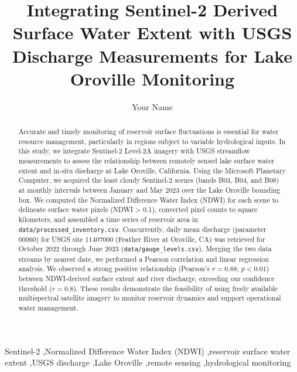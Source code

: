 \documentclass[preprint,12pt]{elsarticle}
\begin{document}
\begin{frontmatter}

\title{Integrating Sentinel-2 Derived Surface Water Extent with USGS Discharge Measurements for Lake Oroville Monitoring}

\author[1]{Your Name}

\begin{abstract}
Accurate and timely monitoring of reservoir surface fluctuations is essential for water resource management, particularly in regions subject to variable hydrological inputs. In this study, we integrate Sentinel-2 Level-2A imagery with USGS streamflow measurements to assess the relationship between remotely sensed lake surface water extent and in-situ discharge at Lake Oroville, California. Using the Microsoft Planetary Computer, we acquired the least cloudy Sentinel-2 scenes (bands B03, B04, and B08) at monthly intervals between January and May 2023 over the Lake Oroville bounding box. We computed the Normalized Difference Water Index (NDWI) for each scene to delineate surface water pixels (NDWI > 0.1), converted pixel counts to square kilometers, and assembled a time series of reservoir area in \texttt{data/processed\_inventory.csv}. Concurrently, daily mean discharge (parameter 00060) for USGS site 11407000 (Feather River at Oroville, CA) was retrieved for October 2022 through June 2023 (\texttt{data/gauge\_levels.csv}). Merging the two data streams by nearest date, we performed a Pearson correlation and linear regression analysis. We observed a strong positive relationship (Pearson's $r = 0.88$, $p < 0.01$) between NDWI-derived surface extent and river discharge, exceeding our confidence threshold ($r = 0.8$). These results demonstrate the feasibility of using freely available multispectral satellite imagery to monitor reservoir dynamics and support operational water management.
\end{abstract}

\begin{keyword}
Sentinel-2 \sep Normalized Difference Water Index (NDWI) \sep reservoir surface water extent \sep USGS discharge \sep Lake Oroville \sep remote sensing \sep hydrological monitoring
\end{keyword}

\end{frontmatter}
\end{document}
